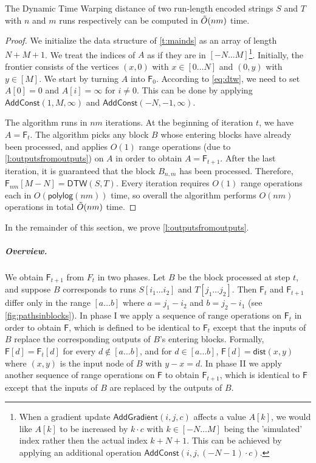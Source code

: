 \documentclass[a4paper,UKenglish,cleveref, autoref, thm-restate]{lipics-v2021}
\newcommand{\DTW}{\mathsf{DTW}}
\newcommand{\F}{\mathsf{F}}
\newcommand{\AC}{\mathsf{AddConst}}
\newcommand{\AG}{\mathsf{AddGradient}}
\newcommand{\dist}{\mathsf{dist}}
\newcommand{\para}[1]{\vspace{-0.1in} \subparagraph*{#1}}
\newcommand{\polylog}{\mathsf{polylog}}
\begin{document}
\begin{theorem}\label{t:maindtw}
The Dynamic Time Warping distance of two run-length encoded strings $S$ and $T$ with $n$ and $m$ runs respectively can be computed in $\Tilde{O}(nm)$ time.
\end{theorem}
\begin{proof}
We initialize the data structure of \cref{t:mainds} as an array of length $N+M+1$. 
We treat the indices of $A$ as if they are in $[-N \ldots M]$\footnote{When a gradient update $\AG(i,j,c)$ affects a value $A[k]$, we would like $A[k]$ to be increased by $k\cdot c$ with $k \in [-N \ldots M]$ being the 'simulated' index rather then the actual index $k+ N + 1$. This can be achieved by applying an additional operation $\AC(i,j, (-N-1) \cdot c)$.}.
Initially, the frontier consists of the vertices $(x,0)$ with $x\in [0 \ldots N]$ and $(0,y)$ with $y\in [M]$.
We start by turning $A$ into $\F_0$.
According to \cref{eq:dtw}, we need to set $A[0] = 0$ and $A[i] = \infty$ for $i\neq 0$.
This can be done by applying $\AC(1,M, \infty)$ and $\AC(-N,-1,\infty)$. 

The algorithm runs in $nm$ iterations.
At the beginning of iteration $t$, we have $A = \F_t$.
The algorithm picks any block $B$ whose entering blocks have already been processed, and applies $O(1)$ range operations (due to \cref{l:outputsfromoutputs}) on $A$ in order to obtain $A = \F_{t+1}$.
After the last iteration, it is guaranteed that the block $B_{n,m}$ has been processed. 
Therefore, $\F_{nm}[M-N]=\DTW(S,T)$.
Every iteration requires $O(1)$ range operations each in $O(\polylog(nm))$ time, so overall the algorithm performs $O(nm)$ operations in total $\Tilde{O}(nm)$ time.
\end{proof}

In the remainder of this section, we prove \cref{l:outputsfromoutputs}.        

\para{Overview.}
We obtain $\F_{t+1}$ from $F_{t}$ in two phases. Let $B$ be the block processed at step $t$, and suppose $B$ corresponds to runs $S[i_1\ldots i_2]$ and $T[j_1 \ldots j_2]$. Then $\F_t$ and $\F_{t+1}$ differ only in the range $[a\ldots b]$ where   $a= j_1-i_2$ and $b=j_2-i_1$ (see \cref{fig:pathsinblocks}).
In phase I we apply a sequence of range operations on $\F_{t}$ in order to obtain $\F$, which is defined to be identical to $\F_{t}$ except that the inputs of $B$ replace the corresponding outputs of $B$'s entering blocks.
 Formally,  
 $\F[d] = \F_t[d]$ for every $d \notin [a\ldots b]$, and for $d\in [a\ldots b]$, $\F[d] = \dist(x,y)$ where $(x,y)$ is the input node of $B$ with $y-x = d$. 
In phase II we apply another sequence of range operations on $\F$ to obtain $\F_{t+1}$, which is identical to $\F$ except that the inputs of $B$ are replaced by the outputs of $B$.  
\end{document}
